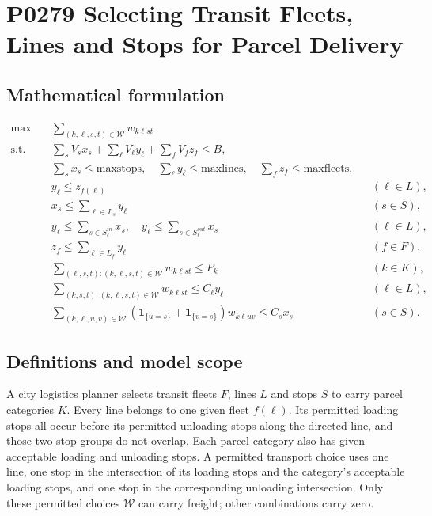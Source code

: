\documentclass[10pt]{article}
\begin{document}
\section*{P0279 Selecting Transit Fleets, Lines and Stops for Parcel Delivery}
\subsection*{Mathematical formulation}
\begin{align*}
\max\quad &\sum_{(k,\ell,s,t)\in\mathcal W}w_{k\ell st}\\
\text{s.t.}\quad&
\sum_s V_sx_s+\sum_\ell V_\ell y_\ell+\sum_f V_fz_f\le B,\\
&\sum_s x_s\le\mathrm{maxstops},\quad
\sum_\ell y_\ell\le\mathrm{maxlines},\quad\sum_fz_f\le\mathrm{maxfleets},\\
&y_\ell\le z_{f(\ell)}&&(\ell\in L),\\
&x_s\le\sum_{\ell\in L_s}y_\ell&&(s\in S),\\
&y_\ell\le\sum_{s\in S_\ell^{in}}x_s,\quad
y_\ell\le\sum_{s\in S_\ell^{out}}x_s&&(\ell\in L),\\
&z_f\le\sum_{\ell\in L_f}y_\ell&&(f\in F),\\
&\sum_{(\ell,s,t):(k,\ell,s,t)\in\mathcal W}w_{k\ell st}\le P_k&&(k\in K),\\
&\sum_{(k,s,t):(k,\ell,s,t)\in\mathcal W}w_{k\ell st}\le C_\ell y_\ell&&(\ell\in L),\\
&\sum_{(k,\ell,u,v)\in\mathcal W}
(\mathbf1_{\{u=s\}}+\mathbf1_{\{v=s\}})w_{k\ell uv}\le C_sx_s&&(s\in S).
\end{align*}

\subsection*{Definitions and model scope}
A city logistics planner selects transit fleets $F$, lines $L$ and stops $S$ to carry parcel categories $K$. Every line belongs to one given fleet $f(\ell)$. Its permitted loading stops all occur before its permitted unloading stops along the directed line, and those two stop groups do not overlap. Each parcel category also has given acceptable loading and unloading stops. A permitted transport choice uses one line, one stop in the intersection of its loading stops and the category's acceptable loading stops, and one stop in the corresponding unloading intersection. Only these permitted choices $\mathcal W$ can carry freight; other combinations carry zero.
\end{document}
